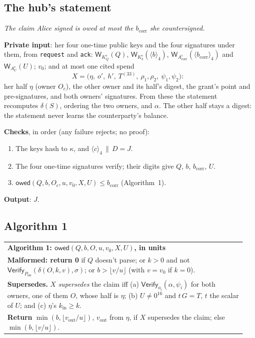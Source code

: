 \documentclass[11pt]{article}
\theoremstyle{plain}
\theoremstyle{definition}
\newcommand{\bcorr}{b_{\mathrm{corr}}}
\newcommand{\tx}[1]{\texttt{#1}}
\newcommand{\be}[2]{\langle #1\rangle_{#2}}
\newcommand{\Vfy}{\mathsf{Verify}}
\newcommand{\Wots}{\mathsf{W}}
\newcommand{\Piss}{P_{\mathrm{iss}}}
\newcommand{\owed}{\mathsf{owed}}
\newcommand{\Oc}{O_c}
\newcommand{\KQ}{K_{Q}^{c}}
\newcommand{\Kb}{K_{b}^{c}}
\newcommand{\Acorr}{A_{\mathrm{corr}}^{c}}
\newcommand{\AU}{A_{U}^{c}}
\newcommand{\kin}{k_{\mathrm{in}}}
\newcommand{\vout}{v_{\mathrm{out}}}
\newenvironment{algobox}[1]
  {\par\smallskip\noindent\begin{tabular}{|p{0.955\linewidth}|}\hline\textbf{#1}\\[2pt]}
  {\\\hline\end{tabular}\par\smallskip}
\begin{document}
\subsection{The hub's statement}\label{sec:statement}

\emph{The claim Alice signed is owed at most the $\bcorr$ she
countersigned.}

\textbf{Private input}: her four one-time public keys and the four
signatures under them, from \tx{request} and \tx{ack}: $\Wots_{\KQ}(Q)$,
$\Wots_{\Kb}(\be{b}{4})$, $\Wots_{\Acorr}(\be{\bcorr}{4})$ and
$\Wots_{\AU}(U)$; $v_0$; and at most one cited spend
\[
  X = \big(\eta,\ o',\ h',\ T^{(33)},\ \rho_1, \rho_2,\ \psi_1, \psi_2\big):
\]
her half $\eta$ (owner $\Oc$), the other owner and its half's digest,
the grant's point and pre-signatures, and both owners' signatures. From
these the statement recomputes $\delta(S)$, ordering the two owners, and
$\alpha$. The other half stays a digest: the statement never learns the
counterparty's balance.

\textbf{Checks}, in order (any failure rejects; no proof):
\begin{enumerate}[nosep]
\item The keys hash to $\kappa$, and $\be{c}{4} \,\|\, D = J$.
\item The four one-time signatures verify; their digits give $Q$, $b$,
  $\bcorr$, $U$.
\item $\owed(Q, b, \Oc, u, v_0, X, U) \le \bcorr$ (Algorithm~1).
\end{enumerate}
\textbf{Output}: $J$.

\subsection{Algorithm 1}\label{sec:algo}

\begin{algobox}{Algorithm 1: $\owed(Q, b, O, u, v_0, X, U)$, in units}
\textbf{Malformed: return 0} if $Q$ doesn't parse; or $k > 0$ and not
$\Vfy_{\Piss}(\delta(O, k, v), \sigma)$; or $b > \lfloor v/u \rfloor$
(with $v = v_0$ if $k = 0$).\\[3pt]
\textbf{Supersedes.} $X$ \emph{supersedes} the claim iff
(a) $\Vfy_{o_i}(\alpha, \psi_i)$ for both owners, one of them $O$, whose
half is $\eta$;
(b) $U \ne 0^{16}$ and $t\,G = T$, $t$ the scalar of $U$; and
(c) $\eta$'s $\kin \ge k$.\\[3pt]
\textbf{Return} $\min(b, \lfloor \vout/u \rfloor)$, $\vout$ from $\eta$,
if $X$ supersedes the claim; else $\min(b, \lfloor v/u \rfloor)$.
\end{algobox}
\end{document}
